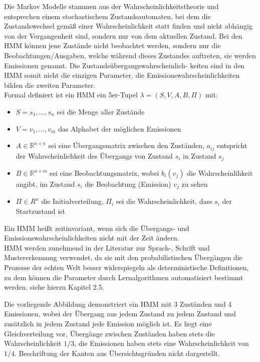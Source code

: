 Die Markov Modelle stammen aus der Wahrscheinlichkeitstheorie und entsprechen einem stochastischem Zustandsautomaten, bei dem die Zustandswechsel gemäß einer Wahrscheinlichkeit statt finden und nicht abhängig von der Vergangenheit sind, sondern nur von dem aktuellen Zustand.
Bei den HMM\cite{Stamp04arevealing} können jene Zustände nicht beobachtet werden, sondern nur die Beobachtungen/Ausgaben, welche während dieses Zustandes auftreten, sie werden Emissionen genannt.
Die Zustandsübergangswahrscheinlich- keiten sind in den HMM somit nicht die einzigen Parameter, die Emissionswahrscheinlichkeiten bilden die zweiten Parameter.\\
Formal definiert ist ein HMM ein 5er-Tupel $\lambda= (S, V, A, B, \Pi)$ mit:
\begin{itemize}
 \item $S = {s_1,..., s_n}$ sei die Menge aller Zustände
 \item $V = {v_1,..., v_m}$ das Alphabet der möglichen Emissionen
 \item $A \in \mathbb{R}^{n \times n}$ sei eine Übergangsmatrix zwischen den Zuständen, $a_{ij}$ entspricht der Wahrscheinlichkeit des Übergangs von Zustand $s_i$ in Zustand $s_j$
 \item $B \in \mathbb{R}^{n\times m}$ sei eine Beobachtungsmatrix, wobei $b_i(v_j)$ die Wahrscheinlihkeit angibt, im Zustand $s_i$ die Beobachtung (Emission) $v_j$ zu sehen
 \item $\Pi \in R^n$ die Initialverteilung, $\Pi_i$ sei die Wahrscheinlichkeit, dass $s_i$ der Startzustand ist
\end{itemize}
Ein HMM heißt zeitinvariant, wenn sich die Übergangs- und Emissionswahrscheinlichkeiten nicht mit der Zeit ändern.\\
HMM werden zunehmend in der Literatur zur Sprach-, Schrift und Mustererkennung \cite{Gales:2007:AHM:1373536.1373537}\cite{Yang1995161} verwendet, da sie mit den probabilistischen Übergängen die Prozesse der echten Welt besser widerspiegeln als deterministische Definitionen, zu dem können die Parameter durch Lernalgorithmen automatisiert bestimmt werden.
 siehe hierzu Kapitel 2.5.




Die vorliegende Abbildung demonstriert ein HMM mit 3 Zuständen und 4 Emissionen, wobei der Übergang aus jedem Zustand zu jedem Zustand und zusätzlich in jedem Zustand jede Emission möglich ist.
Es liegt eine Gleichverteilung vor, Übergänge zwischen Zuständen haben stets die Wahrscheinlichkeit $1/3$, die Emissionen haben stets eine Wahrscheinlichkeit von $1/4$.
Beschriftung der Kanten aus Übersichtsgründen nicht dargestellt.


